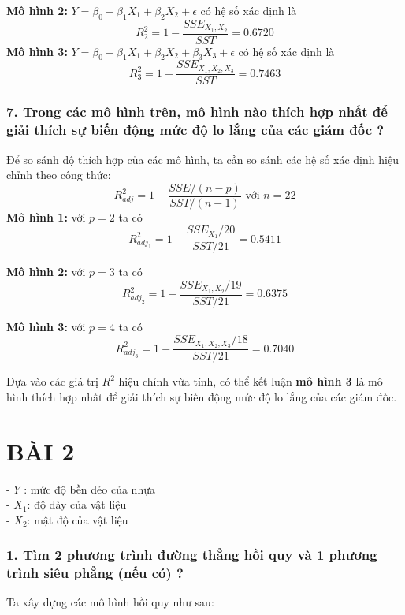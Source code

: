 \documentclass[a4paper]{article}
\theoremstyle{nonumberplain}
\begin{document}
\textbf{Mô hình 2:} $Y = \beta_0 + \beta_1 X_1 + \beta_2 X_2 + \epsilon $ có hệ số xác định là
$$R^2_2 = 1 - \displaystyle \frac{SSE_{X_1,X_2}}{SST} = 0.6720$$
\textbf{Mô hình 3:} $Y = \beta_0 + \beta_1 X_1 + \beta_2 X_2 + \beta_3 X_3 + \epsilon $ có hệ số xác định là
$$R^2_3 = 1 - \displaystyle \frac{SSE_{X_1,X_2,X_3}}{SST} = 0.7463$$



\subsubsection*{7. Trong các mô hình trên, mô hình nào thích hợp nhất để giải thích sự biến động mức độ lo lắng của các giám đốc ?}
Để so sánh độ thích hợp của các mô hình, ta cần so sánh các hệ số xác định hiệu chỉnh theo công thức:
$$R^2_{adj} = 1 - \displaystyle \frac{SSE/(n-p)}{SST/(n-1)} \text{ với } n = 22$$
\textbf{Mô hình 1:} với $p=2$ ta có $$R^2_{adj_1}  = 1 - \displaystyle \frac{SSE_{X_1}/20}{SST/21} = 0.5411$$ 

\textbf{Mô hình 2:} với $p=3$ ta có $$R^2_{adj_2} = 1 - \displaystyle \frac{SSE_{X_1,X_2}/19}{SST/21} = 0.6375$$

\textbf{Mô hình 3:} với $p=4$ ta có $$R^2_{adj_3} = 1 - \displaystyle \frac{SSE_{X_1,X_2,X_3}/18}{SST/21} = 0.7040$$

Dựa vào các giá trị $R^2$ hiệu chỉnh vừa tính, có thể kết luận \textbf{mô hình 3} là mô hình thích hợp nhất để giải thích sự biến động mức độ lo lắng của các giám đốc.
\newpage
\section*{BÀI 2}
- $Y$ : mức độ bền dẻo của nhựa\\
- $X_1$: độ dày của vật liệu\\
- $X_2$: mật độ của vật liệu
\subsubsection*{1. Tìm 2 phương trình đường thẳng hồi quy và 1 phương trình siêu phẳng (nếu có) ?}

Ta xây dựng các mô hình hồi quy như sau:
\end{document}
